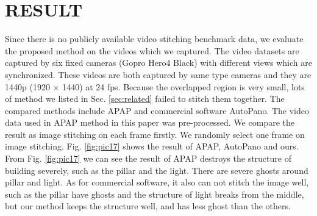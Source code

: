 \documentclass[conference]{IEEEtran}
\begin{document}
\section{RESULT}
\label{sec:result}

Since there is no publicly available video stitching benchmark data, we evaluate the proposed method on the 
videos which we captured.  The video datasets are captured by six fixed cameras (Gopro Hero4 Black) with different views which are synchronized. 
These videos are both captured by same type cameras and they are 1440p (1920 $\times$ 1440) at 24 fps.
Because the overlapped region is very small, lots of method we listed in Sec. \ref{sec:related} failed to stitch them together.
The compared methods include APAP and commercial software AutoPano. The video data used in APAP method in this paper was pre-processed. We compare the result as image stitching on each frame firstly.
We randomly select one frame on image stitching. Fig. \ref{fig:pic17} shows the result of APAP, AutoPano and ours. 
From Fig. \ref{fig:pic17} we can see the result of APAP 
destroys the structure of building severely, such as the pillar and the light. There are severe ghosts around pillar and light.
As for commercial software, it also can not stitch the image well, such as the pillar have ghosts and the structure of light breaks from the middle, 
but our method keeps the structure well, and has less ghost than the others.
\end{document}
